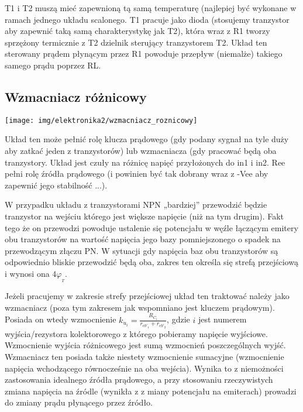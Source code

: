\documentclass{pdfBooklets}
\begin{document}
T1 i T2 muszą mieć zapewnioną tą samą temperaturę (najlepiej być wykonane w ramach jednego układu scalonego.
T1 pracuje jako dioda (stosujemy tranzystor aby zapewnić taką samą charakterystykę jak T2), która wraz z R1 tworzy sprzężony termicznie z T2 dzielnik sterujący tranzystorem T2. Układ ten sterowany prądem płynącym przez R1 powoduje przepływ (niemalże) takiego samego prądu poprzez RL.

\subsection{Wzmacniacz różnicowy}
\begin{center}\texttt{[image: img/elektronika2/wzmacniacz\_roznicowy]}\end{center}

Układ ten może pełnić rolę klucza prądowego (gdy podany sygnał na tyle duży aby zatkać jeden z tranzystorów) lub wzmacniacza (gdy pracować będą oba tranzystory.
Układ jest czuły na różnicę napięć przyłożonych do in1 i in2.
Ree pełni rolę źródła prądowego (i powinien być tak dobrany wraz z -Vee aby zapewnić jego stabilność ...).

W przypadku układu z tranzystorami NPN „bardziej” przewodzić będzie tranzystor na wejściu którego jest większe napięcie (niż na tym drugim).
Fakt tego że on przewodzi powoduje ustalenie się potencjału w węźle łączącym emitery obu tranzystorów na wartość napięcia jego bazy pomniejszonego o spadek na przewodzącym złączu PN.
W sytuacji gdy napięcia baz obu tranzystorów są odpowiednio bliskie przewodzić będą oba, zakres ten określa się strefą przejściową i wynosi ona $4 \varphi_{_T}$.


Jeżeli pracujemy w zakresie strefy przejściowej układ ten traktować należy jako wzmacniacz (poza tym zakresem jak wspomniano jest kluczem prądowym).
Posiada on wtedy wzmocnienie $k_{u_i} = \frac{R_{C_i}}{r_{eb'_1} + r_{eb'_2}}$, gdzie $i$ jest numerem wyjścia/rezystora kolektorowego z którego pobieramy napięcie wyjściowe.
Wzmocnienie wyjścia różnicowego jest sumą wzmocnień poszczególnych wyjść.
Wzmacniacz ten posiada także niestety wzmocnienie sumacyjne (wzmocnienie napięcia wchodzącego równocześnie na oba wejścia).
Wynika to z niemożności zastosowania idealnego źródła prądowego, a przy stosowaniu rzeczywistych zmiana napięcia na źródle (wynikła z z miany potencjału na emiterach) prowadzi do zmiany prądu płynącego przez źródło.
\end{document}
